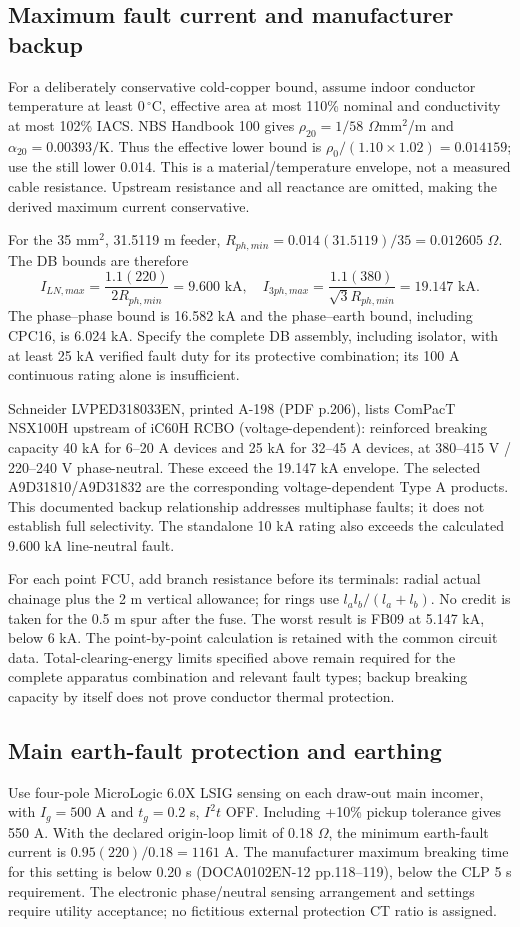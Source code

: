 \subsection*{Maximum fault current and manufacturer backup}
For a deliberately conservative cold-copper bound, assume indoor conductor temperature at least 0\,$^\circ$C, effective area at most 110\% nominal and conductivity at most 102\% IACS. NBS Handbook 100 gives $\rho_{20}=1/58$ $\Omega$mm$^2$/m and $\alpha_{20}=0.00393/\mathrm{K}$. Thus the effective lower bound is $\rho_0/(1.10\times1.02)=0.014159$; use the still lower 0.014. This is a material/temperature envelope, not a measured cable resistance. Upstream resistance and all reactance are omitted, making the derived maximum current conservative.

For the 35 mm$^2$, 31.5119 m feeder, $R_{ph,min}=0.014(31.5119)/35=0.012605$ $\Omega$. The DB bounds are therefore
\[
I_{LN,max}=\frac{1.1(220)}{2R_{ph,min}}=9.600\text{ kA},\quad
I_{3ph,max}=\frac{1.1(380)}{\sqrt3R_{ph,min}}=19.147\text{ kA}.
\]
The phase--phase bound is 16.582 kA and the phase--earth bound, including CPC16, is 6.024 kA. Specify the complete DB assembly, including isolator, with at least 25 kA verified fault duty for its protective combination; its 100 A continuous rating alone is insufficient.

Schneider LVPED318033EN, printed A-198 (PDF p.206), lists ComPacT NSX100H upstream of iC60H RCBO (voltage-dependent): reinforced breaking capacity 40 kA for 6--20 A devices and 25 kA for 32--45 A devices, at 380--415 V / 220--240 V phase-neutral. These exceed the 19.147 kA envelope. The selected A9D31810/A9D31832 are the corresponding voltage-dependent Type A products. This documented backup relationship addresses multiphase faults; it does not establish full selectivity. The standalone 10 kA rating also exceeds the calculated 9.600 kA line-neutral fault.

For each point FCU, add branch resistance before its terminals: radial actual chainage plus the 2 m vertical allowance; for rings use $l_a l_b/(l_a+l_b)$. No credit is taken for the 0.5 m spur after the fuse. The worst result is FB09 at 5.147 kA, below 6 kA. The point-by-point calculation is retained with the common circuit data. Total-clearing-energy limits specified above remain required for the complete apparatus combination and relevant fault types; backup breaking capacity by itself does not prove conductor thermal protection.

\subsection*{Main earth-fault protection and earthing}
Use four-pole MicroLogic 6.0X LSIG sensing on each draw-out main incomer, with $I_g=500$ A and $t_g=0.2$ s, $I^2t$ OFF. Including +10\% pickup tolerance gives 550 A. With the declared origin-loop limit of 0.18 $\Omega$, the minimum earth-fault current is $0.95(220)/0.18=1161$ A. The manufacturer maximum breaking time for this setting is below 0.20 s (DOCA0102EN-12 pp.118--119), below the CLP 5 s requirement. The electronic phase/neutral sensing arrangement and settings require utility acceptance; no fictitious external protection CT ratio is assigned.

